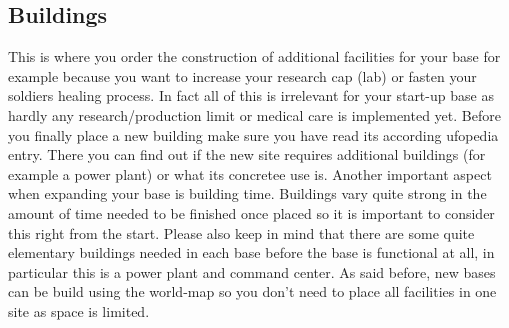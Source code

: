 \subsection{Buildings}
This is where you order the construction of additional facilities for your base for example because you want to increase your research cap (lab) or fasten your soldiers healing process.
In fact all of this is irrelevant for your start-up base as hardly any research/production limit or medical care is implemented yet. Before you finally place a new building make sure you have read its according ufopedia entry. There you can find out if the new site requires additional buildings (for example a power plant) or what its concretee use is. Another important aspect when expanding your base is building time. Buildings vary quite strong in the amount of time needed to be finished once placed so it is important to consider this right from the start. Please also keep in mind that there are some quite elementary buildings needed in each base before the base is functional at all, in particular this is a power plant and command center. As said before, new bases can be build using the world-map so you don't need to place all facilities in one site as space is limited.

